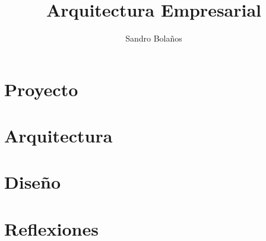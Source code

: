 \documentclass[12pt]{book}
\title{Arquitectura Empresarial}
\author{Sandro Bolaños}
\begin{document}
\maketitle
\tableofcontents
\listoffigures
\part{Proyecto}


\part{Arquitectura}






\part{Diseño}



\part{Reflexiones}

\end{document}
